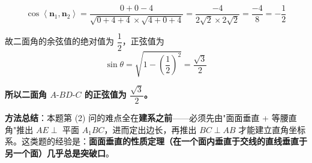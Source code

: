 \begin{answer}
\nopagebreak[4]
\[\cos\left\langle\boldsymbol n_1,\boldsymbol n_2\right\rangle=\frac{0+0-4}{\sqrt{0+4+4}\times\sqrt{4+0+4}}=\frac{-4}{2\sqrt2\times2\sqrt2}=\frac{-4}8=-\frac12\]

故二面角的余弦值的绝对值为 $\dfrac12$，正弦值为
\nopagebreak[4]
\[\sin\theta=\sqrt{1-\left(\frac12\right)^{2}}=\frac{\sqrt3}2\]

\textbf{所以二面角 $A\text{-}BD\text{-}C$ 的正弦值为 $\dfrac{\sqrt3}2$。}

\begin{gktip}
\textbf{方法总结}：本题第 (2) 问的难点全在\textbf{建系之前}——必须先由"面面垂直 + 等腰直角"推出 $AE\perp$ 平面 $A_1BC$，进而定出边长，再推出 $BC\perp AB$ 才能建立直角坐标系。这类题的经验是：\textbf{面面垂直的性质定理（在一个面内垂直于交线的直线垂直于另一个面）几乎总是突破口}。
\end{gktip}



\par\medskip

\end{answer}
